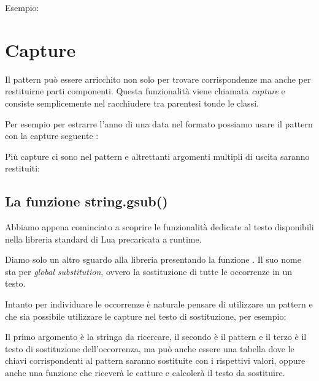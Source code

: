 Esempio:

\section{Capture}
\label{secFondCapture}

Il pattern può essere arricchito non solo per trovare corrispondenze ma anche
per restituirne parti componenti. Questa funzionalità viene chiamata
\emph{capture} e consiste semplicemente nel racchiudere tra parentesi tonde le
classi.

Per esempio per estrarre l'anno di una data nel formato 
possiamo usare il pattern con la capture seguente
:

Più capture ci sono nel pattern e altrettanti argomenti multipli di uscita
saranno restituiti:



\subsection{La funzione string.gsub()}
\label{secFondGsub}

Abbiamo appena cominciato a scoprire le funzionalità dedicate al testo
disponibili nella libreria standard di Lua precaricata a runtime.

Diamo solo un altro sguardo alla libreria presentando la funzione
. Il suo nome sta per \emph{global substitution}, ovvero
la sostituzione di tutte le occorrenze in un testo.

Intanto per individuare le occorrenze è naturale pensare di utilizzare un
pattern e che sia possibile utilizzare le capture nel testo di sostituzione,
per esempio:

Il primo argomento è la stringa da ricercare, il secondo è il pattern e il
terzo è il testo di sostituzione dell'occorrenza, ma può anche essere una
tabella dove le chiavi corrispondenti al pattern saranno sostituite con
i rispettivi valori, oppure anche una funzione che riceverà le catture e
calcolerà il testo da sostituire.

